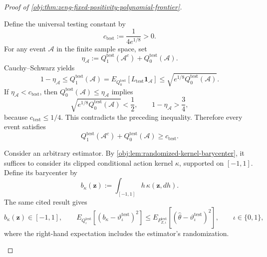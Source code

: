 \begin{proof}[Proof of \cref{obj:thm:zeng-fixed-positivity-polynomial-frontier}]
\begin{enumerate}
Define the universal testing constant by
\[
c_{\mathrm{test}}:=\frac1{4e^{1/8}}>0.
\]
For any event \(\mathcal A\) in the finite sample space, set
\[
\eta_{\mathcal A}
:=
Q^{\mathrm{test}}_1(\mathcal A^c)
+
Q^{\mathrm{test}}_0(\mathcal A).
\]
Cauchy--Schwarz yields
\[
1-\eta_{\mathcal A}
\le Q^{\mathrm{test}}_1(\mathcal A)
=
E_{Q^{\mathrm{test}}_0}
[L_{\mathrm{test}}\mathbf1_{\mathcal A}]
\le
\sqrt{e^{1/8}Q^{\mathrm{test}}_0(\mathcal A)}.
\]
If \(\eta_{\mathcal A}<c_{\mathrm{test}}\), then
\(Q^{\mathrm{test}}_0(\mathcal A)\le\eta_{\mathcal A}\) implies
\[
\sqrt{e^{1/8}Q^{\mathrm{test}}_0(\mathcal A)}
<\frac12,
\qquad
1-\eta_{\mathcal A}>\frac34,
\]
because \(c_{\mathrm{test}}\le1/4\). This contradicts the preceding
inequality. Therefore every event satisfies
\[
Q^{\mathrm{test}}_1(\mathcal A^c)
+
Q^{\mathrm{test}}_0(\mathcal A)
\ge c_{\mathrm{test}}.
\]

Consider an arbitrary estimator. By
\cref{obj:lem:randomized-kernel-barycenter}, it suffices to consider its
clipped conditional action kernel \(\kappa\), supported on \([-1,1]\).
Define its barycenter by
\[
b_\kappa(\mathbf z)
:=
\int_{[-1,1]}h\,\kappa(\mathbf z,dh).
\]
The same cited result gives
\[
b_\kappa(\mathbf z)\in[-1,1],
\qquad
E_{Q^{\mathrm{test}}_\iota}
\left[
(b_\kappa-\vartheta^{\mathrm{test}}_\iota)^2
\right]
\le
E_{P^{\mathrm{test}}_{Z,\iota}}
\left[
(\widehat\theta-\vartheta^{\mathrm{test}}_\iota)^2
\right],
\qquad \iota\in\{0,1\},
\]
where the right-hand expectation includes the estimator's
randomization.


\end{enumerate}
\end{proof}
